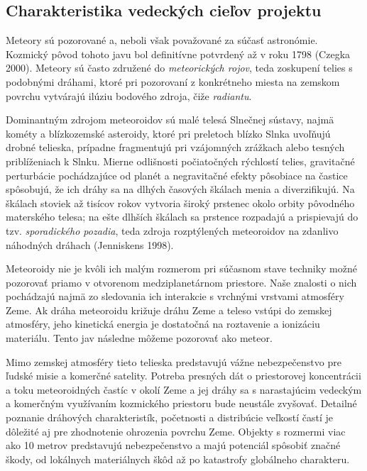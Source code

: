 \subsection{Charakteristika vedeckých cieľov
projektu}\label{charakteristika-vedeckuxfdch-cieux13eov-projektu}

Meteory sú pozorované a, neboli však považované za súčasť astronómie.
Kozmický pôvod tohoto javu bol definitívne potvrdený až v roku 1798
(Czegka 2000). Meteory sú často združené do \emph{meteorických rojov},
teda zoskupení telies s podobnými dráhami, ktoré pri pozorovaní z
konkrétneho miesta na zemskom povrchu vytvárajú ilúziu bodového zdroja,
čiže \emph{radiantu}.

Dominantným zdrojom meteoroidov sú malé telesá Slnečnej sústavy, najmä
kométy a blízkozemské asteroidy, ktoré pri preletoch blízko Slnka
uvoľňujú drobné telieska, prípadne fragmentujú pri vzájomných zrážkach
alebo tesných priblíženiach k Slnku. Mierne odlišnosti počiatočných
rýchlostí telies, gravitačné perturbácie pochádzajúce od planét a
negravitačné efekty pôsobiace na častice spôsobujú, že ich dráhy sa na
dlhých časových škálach menia a diverzifikujú. Na škálach stoviek až
tisícov rokov vytvoria široký prstenec okolo orbity pôvodného materského
telesa; na ešte dlhších škálach sa prstence rozpadajú a prispievajú do
tzv. \emph{sporadického pozadia}, teda zdroja rozptýlených meteoroidov
na zdanlivo náhodných dráhach (Jenniskens 1998).

Meteoroidy nie je kvôli ich malým rozmerom pri súčasnom stave techniky
možné pozorovať priamo v otvorenom medziplanetárnom priestore. Naše
znalosti o nich pochádzajú najmä zo sledovania ich interakcie s vrchnými
vrstvami atmosféry Zeme. Ak dráha meteoroidu križuje dráhu Zeme a teleso
vstúpi do zemskej atmosféry, jeho kinetická energia je dostatočná na
roztavenie a ionizáciu materiálu. Tento jav následne môžeme pozorovať
ako meteor.

Mimo zemskej atmosféry tieto telieska predstavujú vážne nebezpečenstvo
pre ľudské misie a komerčné satelity. Potreba presných dát o
priestorovej koncentrácii a toku meteoroidných častíc v okolí Zeme a jej
dráhy sa s narastajúcim vedeckým a komerčným využívaním kozmického
priestoru bude neustále zvyšovať. Detailné poznanie dráhových
charakteristík, početnosti a distribúcie veľkostí častí je dôležité aj
pre zhodnotenie ohrozenia povrchu Zeme. Objekty s rozmermi viac ako 10
metrov predstavujú nebezpečenstvo a majú potenciál spôsobiť značné
škody, od lokálnych materiálnych škôd až po katastrofy globálneho
charakteru.

